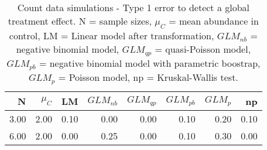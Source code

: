 \begin{table}[H]
\centering
\caption{Count data simulations - Type 1 error to detect a global treatment effect. N = sample sizes, 
             $\mu_C$ = mean abundance in control, LM = Linear model after transformation, 
             $GLM_{nb}$ = negative binomial model, $GLM_{qp}$ = quasi-Poisson model, 
             $GLM_{pb}$ = negative binomial model with parametric boostrap, 
             $GLM_{p}$ = Poisson model, np = Kruskal-Wallis test.} 
\label{tab:t1_glob_c}
{\footnotesize
\begin{tabular}{rrrrrrrr}
  \hline
N & $\mu_C$ & LM & $GLM_{nb}$ & $GLM_{qp}$ & $GLM_{pb}$ & $GLM_{p}$ & np \\ 
  \hline
3.00 & 2.00 & 0.10 & 0.00 & 0.00 & 0.10 & 0.20 & 0.10 \\ 
  6.00 & 2.00 & 0.00 & 0.25 & 0.00 & 0.10 & 0.30 & 0.00 \\ 
   \hline
\end{tabular}
}
\end{table}
